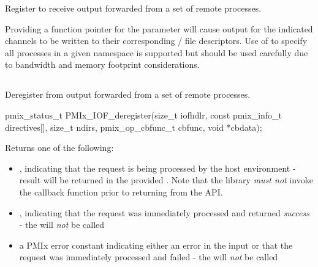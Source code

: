 \optattrend

\descr

Register to receive output forwarded from a set of remote processes.

\adviceuserstart
Providing a  function pointer for the  parameter will cause output for the indicated channels to be written to their corresponding / file descriptors. Use of  to specify all processes in a given namespace is supported but should be used carefully due to bandwidth and memory footprint considerations.
\adviceuserend


\subsection{}

\summary

Deregister from output forwarded from a set of remote processes.

\format

\cspecificstart
\begin{codepar}
pmix_status_t
PMIx_IOF_deregister(size_t iofhdlr,
                    const pmix_info_t directives[], size_t ndirs,
                    pmix_op_cbfunc_t cbfunc, void *cbdata);
\end{codepar}
\cspecificend

\begin{arglist}
\end{arglist}

Returns one of the following:

\begin{itemize}
    \item {}, indicating that the request is being processed by the host environment - result will be returned in the provided . Note that the library \emph{must not} invoke the callback function prior to returning from the \ac{API}.
    \item {}, indicating that the request was immediately processed and returned \textit{success} - the  will \textit{not} be called
    \item a PMIx error constant indicating either an error in the input or that the request was immediately processed and failed - the  will \textit{not} be called
\end{itemize}

